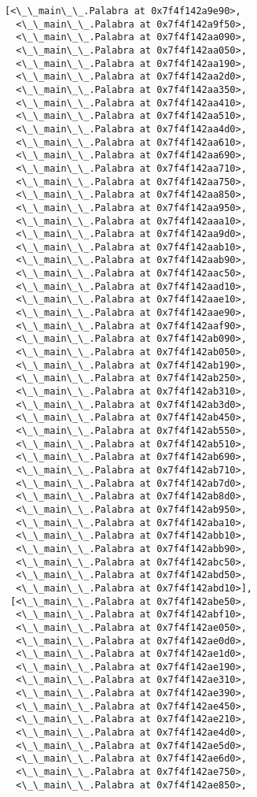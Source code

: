 \documentclass[12pt,a4paper,table]{article}
\begin{document}
\begin{tcolorbox}[breakable, size=fbox, boxrule=.5pt, pad at break*=1mm, opacityfill=0]
\begin{Verbatim}[commandchars=\\\{\}]
 [<\_\_main\_\_.Palabra at 0x7f4f142a9e90>,
  <\_\_main\_\_.Palabra at 0x7f4f142a9f50>,
  <\_\_main\_\_.Palabra at 0x7f4f142aa090>,
  <\_\_main\_\_.Palabra at 0x7f4f142aa050>,
  <\_\_main\_\_.Palabra at 0x7f4f142aa190>,
  <\_\_main\_\_.Palabra at 0x7f4f142aa2d0>,
  <\_\_main\_\_.Palabra at 0x7f4f142aa350>,
  <\_\_main\_\_.Palabra at 0x7f4f142aa410>,
  <\_\_main\_\_.Palabra at 0x7f4f142aa510>,
  <\_\_main\_\_.Palabra at 0x7f4f142aa4d0>,
  <\_\_main\_\_.Palabra at 0x7f4f142aa610>,
  <\_\_main\_\_.Palabra at 0x7f4f142aa690>,
  <\_\_main\_\_.Palabra at 0x7f4f142aa710>,
  <\_\_main\_\_.Palabra at 0x7f4f142aa750>,
  <\_\_main\_\_.Palabra at 0x7f4f142aa850>,
  <\_\_main\_\_.Palabra at 0x7f4f142aa950>,
  <\_\_main\_\_.Palabra at 0x7f4f142aaa10>,
  <\_\_main\_\_.Palabra at 0x7f4f142aa9d0>,
  <\_\_main\_\_.Palabra at 0x7f4f142aab10>,
  <\_\_main\_\_.Palabra at 0x7f4f142aab90>,
  <\_\_main\_\_.Palabra at 0x7f4f142aac50>,
  <\_\_main\_\_.Palabra at 0x7f4f142aad10>,
  <\_\_main\_\_.Palabra at 0x7f4f142aae10>,
  <\_\_main\_\_.Palabra at 0x7f4f142aae90>,
  <\_\_main\_\_.Palabra at 0x7f4f142aaf90>,
  <\_\_main\_\_.Palabra at 0x7f4f142ab090>,
  <\_\_main\_\_.Palabra at 0x7f4f142ab050>,
  <\_\_main\_\_.Palabra at 0x7f4f142ab190>,
  <\_\_main\_\_.Palabra at 0x7f4f142ab250>,
  <\_\_main\_\_.Palabra at 0x7f4f142ab310>,
  <\_\_main\_\_.Palabra at 0x7f4f142ab3d0>,
  <\_\_main\_\_.Palabra at 0x7f4f142ab450>,
  <\_\_main\_\_.Palabra at 0x7f4f142ab550>,
  <\_\_main\_\_.Palabra at 0x7f4f142ab510>,
  <\_\_main\_\_.Palabra at 0x7f4f142ab690>,
  <\_\_main\_\_.Palabra at 0x7f4f142ab710>,
  <\_\_main\_\_.Palabra at 0x7f4f142ab7d0>,
  <\_\_main\_\_.Palabra at 0x7f4f142ab8d0>,
  <\_\_main\_\_.Palabra at 0x7f4f142ab950>,
  <\_\_main\_\_.Palabra at 0x7f4f142aba10>,
  <\_\_main\_\_.Palabra at 0x7f4f142abb10>,
  <\_\_main\_\_.Palabra at 0x7f4f142abb90>,
  <\_\_main\_\_.Palabra at 0x7f4f142abc50>,
  <\_\_main\_\_.Palabra at 0x7f4f142abd50>,
  <\_\_main\_\_.Palabra at 0x7f4f142abd10>],
 [<\_\_main\_\_.Palabra at 0x7f4f142abe50>,
  <\_\_main\_\_.Palabra at 0x7f4f142abf10>,
  <\_\_main\_\_.Palabra at 0x7f4f142ae050>,
  <\_\_main\_\_.Palabra at 0x7f4f142ae0d0>,
  <\_\_main\_\_.Palabra at 0x7f4f142ae1d0>,
  <\_\_main\_\_.Palabra at 0x7f4f142ae190>,
  <\_\_main\_\_.Palabra at 0x7f4f142ae310>,
  <\_\_main\_\_.Palabra at 0x7f4f142ae390>,
  <\_\_main\_\_.Palabra at 0x7f4f142ae450>,
  <\_\_main\_\_.Palabra at 0x7f4f142ae210>,
  <\_\_main\_\_.Palabra at 0x7f4f142ae4d0>,
  <\_\_main\_\_.Palabra at 0x7f4f142ae5d0>,
  <\_\_main\_\_.Palabra at 0x7f4f142ae6d0>,
  <\_\_main\_\_.Palabra at 0x7f4f142ae750>,
  <\_\_main\_\_.Palabra at 0x7f4f142ae850>,

\end{Verbatim}
\end{tcolorbox}
\end{document}
